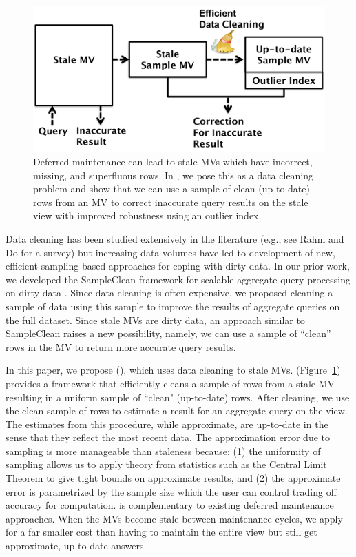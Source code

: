 \begin{figure}[t] \vspace{-2em}
\centering
 \includegraphics[scale=0.27]{figs/sys-arch.pdf} \vspace{-.25em}
 \caption{Deferred maintenance can lead to stale MVs which have incorrect, missing, and superfluous rows. In \svc, we pose this as a data cleaning problem and show that we can use a sample of clean (up-to-date) rows from an MV to correct inaccurate query results on the stale view with improved robustness using an outlier index. \label{sys-arch}}\vspace{-1.75em}
\end{figure}

Data cleaning has been studied extensively in the literature (e.g., see Rahm and Do for a survey\cite{rahm2000data}) but increasing data volumes have led to development of new, efficient sampling-based approaches for coping with dirty data.   
In our prior work, we developed the SampleClean framework for scalable aggregate query processing on dirty data \cite{wang1999sample}.
Since data cleaning is often expensive, we proposed cleaning a sample of data using this sample to improve the results of aggregate queries on the full dataset.
Since stale MVs are dirty data, an approach similar to SampleClean raises a new possibility, namely, we can use a sample of ``clean'' rows in the MV to return more accurate query results.

In this paper, we propose \svcfull (\svc), which uses data cleaning to stale MVs.
\svc (Figure~\ref{sys-arch}) provides a framework that efficiently cleans a sample of rows from a stale MV resulting in a uniform sample of ``clean" (up-to-date) rows.
After cleaning, we use the clean sample of rows to estimate a result for an aggregate query on the view.
The estimates from this procedure, while approximate, are up-to-date in the sense that they reflect the most recent data. 
The approximation error due to sampling is more manageable than staleness because: (1) the uniformity of sampling allows us to apply theory from statistics such as the Central Limit Theorem to give tight bounds on approximate results, and (2) the approximate error is parametrized by the sample size which the user can control trading off accuracy for computation.
\svc is complementary to existing deferred maintenance approaches.
When the MVs become stale between maintenance cycles, we apply \svc for a far smaller cost than having to maintain the entire view but still get approximate, up-to-date answers.

